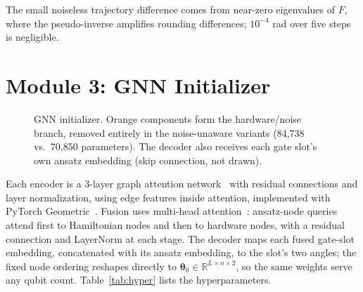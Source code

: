 \documentclass{ssnreview}
\begin{document}
The small noiseless trajectory difference comes from near-zero eigenvalues of $F$, where the
pseudo-inverse amplifies rounding differences; $10^{-4}$ rad over five steps is negligible.

\section{Module 3: GNN Initializer}

\begin{figure}[H]
\centering
{}
\caption{GNN initializer. Orange components form the hardware/noise branch, removed entirely in
the noise-unaware variants (84{,}738 vs.\ 70{,}850 parameters). The decoder also receives each
gate slot's own ansatz embedding (skip connection, not drawn).}\label{fig:gnn}
\end{figure}

Each encoder is a 3-layer graph attention network~\cite{gat} with residual connections and
layer normalization, using edge features inside attention, implemented with PyTorch
Geometric~\cite{pyg}. Fusion uses multi-head attention~\cite{vaswani2017}: ansatz-node queries
attend first to Hamiltonian nodes and then to hardware nodes, with a residual connection and
LayerNorm at each stage. The decoder maps each fused gate-slot embedding, concatenated with its
ansatz embedding, to the slot's two angles; the fixed node ordering reshapes directly to
$\boldsymbol\theta_0\in\mathbb{R}^{L\times n\times2}$, so the same weights serve any qubit
count. Table~\ref{tab:hyper} lists the hyperparameters.
\end{document}
